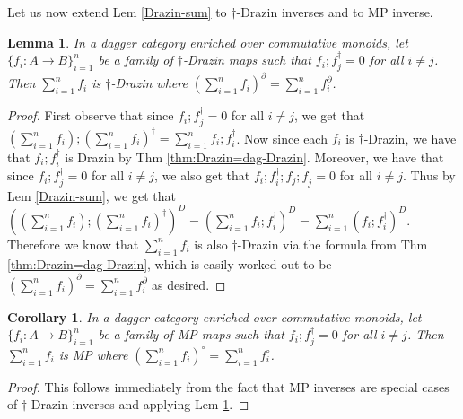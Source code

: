 \documentclass[submission,copyright,creativecommons]{eptcs}
\newtheorem{lemma}[observation]{Lemma}  %
\newtheorem{corollary}[observation]{Corollary}
\begin{document}
Let us now extend Lem \ref{Drazin-sum} to $\dagger$-Drazin inverses and to MP inverse. 

\begin{lemma}\label{lem:dag-draz-sum} In a dagger category enriched over commutative monoids, let $\lbrace f_i: A \to B \rbrace^n_{i=1}$ be a family of $\dagger$-Drazin maps such that $f_i; f^\dagger_j=0$ for all $i \neq j$. Then $\sum \limits^n_{i=1} f_i$ is $\dagger$-Drazin where $\left(\sum \limits^n_{i=1} f_i \right)^\partial = \sum \limits^n_{i=1} f_i^\partial$.
\end{lemma}
\begin{proof} First observe that since $f_i; f^\dagger_j=0$ for all $i \neq j$, we get that $\left( \sum \limits^n_{i=1} f_i\right); \left( \sum \limits^n_{i=1} f_i\right)^\dagger= \sum \limits^n_{i=1} f_i;f_i^\dagger$. Now since each $f_i$ is $\dagger$-Drazin, we have that $f_i;f_i^\dagger$ is Drazin by Thm \ref{thm:Drazin=dag-Drazin}. Moreover, we have that since $f_i; f^\dagger_j=0$ for all $i \neq j$, we also get that $f_i;f_i^\dagger;f_j;f_j^\dagger=0$ for all $i \neq j$. Thus by Lem \ref{Drazin-sum}, we get that $\left( \left( \sum \limits^n_{i=1} f_i\right); \left( \sum \limits^n_{i=1} f_i\right)^\dagger \right)^D = \left(\sum \limits^n_{i=1} f_i;f_i^\dagger\right)^D = \sum \limits^n_{i=1} (f_i;f_i^\dagger)^D$. Therefore we know that $\sum \limits^n_{i=1} f_i$ is also $\dagger$-Drazin via the formula from Thm \ref{thm:Drazin=dag-Drazin}, which is easily worked out to be $\left(\sum \limits^n_{i=1} f_i \right)^\partial = \sum \limits^n_{i=1} f_i^\partial$ as desired. 
\end{proof}

\begin{corollary} In a dagger category enriched over commutative monoids, let $\lbrace f_i: A \to B \rbrace^n_{i=1}$ be a family of MP maps such that $f_i; f^\dagger_j=0$ for all $i \neq j$. Then $\sum \limits^n_{i=1} f_i$ is MP where $\left(\sum \limits^n_{i=1} f_i \right)^\circ = \sum \limits^n_{i=1} f_i^\circ$.
\end{corollary} 
\begin{proof} This follows immediately from the fact that MP inverses are special cases of $\dagger$-Drazin inverses and applying Lem \ref{lem:dag-draz-sum}.   
\end{proof}
\end{document}
